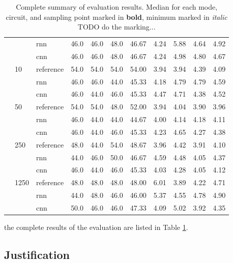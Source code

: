 \begin{table}
{\begin{tabular}{lllrrrrrrrr}
	&      & rnn &          46.0 &   46.0 &   48.0 &   46.67 &          4.24 &   5.88 &   4.64 &   4.92 \\
	&      & cnn &          46.0 &   46.0 &   48.0 &   46.67 &          4.24 &   4.98 &   4.80 &   4.67 \\
	& 10   & reference &          54.0 &   54.0 &   54.0 &   54.00 &          3.94 &   3.94 &   4.39 &   4.09 \\
	&      & rnn &          46.0 &   46.0 &   44.0 &   45.33 &          4.18 &   4.79 &   4.79 &   4.59 \\
	&      & cnn &          46.0 &   44.0 &   46.0 &   45.33 &          4.47 &   4.71 &   4.38 &   4.52 \\
	& 50   & reference &          54.0 &   54.0 &   48.0 &   52.00 &          3.94 &   4.04 &   3.90 &   3.96 \\
	&      & rnn &          46.0 &   44.0 &   44.0 &   44.67 &          4.00 &   4.14 &   4.18 &   4.11 \\
	&      & cnn &          46.0 &   44.0 &   46.0 &   45.33 &          4.23 &   4.65 &   4.27 &   4.38 \\
	& 250  & reference &          48.0 &   44.0 &   54.0 &   48.67 &          3.96 &   4.42 &   3.91 &   4.10 \\
	&      & rnn &          44.0 &   46.0 &   50.0 &   46.67 &          4.59 &   4.48 &   4.05 &   4.37 \\
	&      & cnn &          46.0 &   44.0 &   46.0 &   45.33 &          4.03 &   4.28 &   4.05 &   4.12 \\
	& 1250 & reference &          48.0 &   48.0 &   48.0 &   48.00 &          6.01 &   3.89 &   4.22 &   4.71 \\
	&      & rnn &          44.0 &   48.0 &   46.0 &   46.00 &          5.37 &   4.55 &   4.78 &   4.90 \\
	&      & cnn &          50.0 &   46.0 &   46.0 &   47.33 &          4.09 &   5.02 &   3.92 &   4.35 \\
	\bottomrule
\end{tabular}
}
\caption{Complete summary of evaluation results. Median for each mode, circuit, and sampling point marked in \textbf{bold}, minimum marked in \textit{italic} TODO do the marking...}
\label{table:eval-complete}
\end{table}

the complete results of the evaluation are listed in Table \ref{table:eval-complete}.

\subsection{Justification}\label{ch:Justification}

